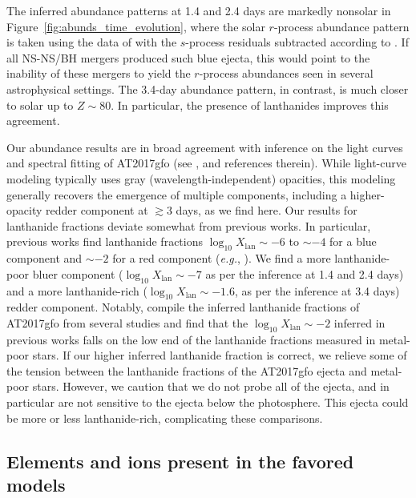 \documentclass[twocolumn,twocolappendix]{aastex63}
\def\eg{{\it e.g.}}
\begin{document}
{{{{{{The inferred abundance patterns at 1.4 and 2.4 days are markedly nonsolar in Figure~\ref{fig:abunds_time_evolution}, where the solar $r$-process abundance pattern is taken using the data of \cite{lodders09} with the $s$-process residuals subtracted according to \cite{bisterzo14}. If all NS-NS/BH mergers produced such blue ejecta, this would point to the inability of these mergers to yield the $r$-process abundances seen in several astrophysical settings. The 3.4-day abundance pattern, in contrast, is much closer to solar up to $Z \sim 80$. In particular, the presence of lanthanides improves this agreement. 

Our abundance results are in broad agreement with inference on the light curves and spectral fitting of AT2017gfo (see \citealt{ji19}, and references therein). While light-curve modeling typically uses gray (wavelength-independent) opacities, this modeling generally recovers the emergence of multiple components, including a higher-opacity redder component at $\gtrsim$3 days, as we find here. Our results for lanthanide fractions deviate somewhat from previous works. In particular, previous works find lanthanide fractions $\log_{10} X_{\mathrm{lan}} \sim -6$ to $\sim$$-4$ for a blue component and $\sim$$-2$ for a red component (\eg, \citealt{chornock17, kasen17}). We find a more lanthanide-poor bluer component ($\log_{10} X_{\mathrm{lan}} \sim -7$ as per the inference at 1.4 and 2.4 days) and a more lanthanide-rich ($\log_{10} X_{\mathrm{lan}} \sim -1.6$, as per the inference at 3.4 days) redder component. Notably, \cite{ji19} compile the inferred lanthanide fractions of AT2017gfo from several studies and find that the $\log_{10} X_{\mathrm{lan}} \sim -2$ inferred in previous works falls on the low end of the lanthanide fractions measured in metal-poor stars. If our higher inferred lanthanide fraction is correct, we relieve some of the tension between the lanthanide fractions of the AT2017gfo ejecta and metal-poor stars. However, we caution that we do not probe all of the ejecta, and in particular are not sensitive to the ejecta below the photosphere. This ejecta could be more or less lanthanide-rich, complicating these comparisons.




\subsection{Elements and ions present in the favored models}\label{ssc:disco-elements}

}}}}}}
\end{document}
